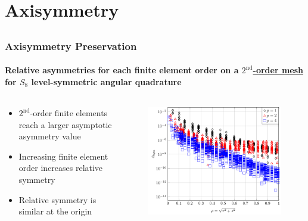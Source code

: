 \documentclass[compress,t]{beamer}
\begin{document}
\section{Axisymmetry}
\subsection{}

\begin{frame}[t]
\frametitle{Axisymmetry Preservation}
\framesubtitle{Relative asymmetries for each finite element order on a \underline{$2^\text{nd}$-order mesh} for $S_8$ level-symmetric angular quadrature}

\begin{columns}[T]

\begin{column}{0.4\textwidth}
\begin{itemize}
\item{$2^\text{nd}$-order finite elements reach a larger asymptotic asymmetry value}
\item{Increasing finite element order increases relative symmetry}
\item{Relative symmetry is similar at the origin}
\end{itemize}

\end{column}

\begin{column}{0.6\textwidth}
\begin{figure}
\flushright
\includegraphics[scale=0.6]{./graphics/RZASMMSLinearRhoBrunnerS8g2r2.pdf}
\end{figure}

\end{column}

\end{columns}

\end{frame}
\end{document}
